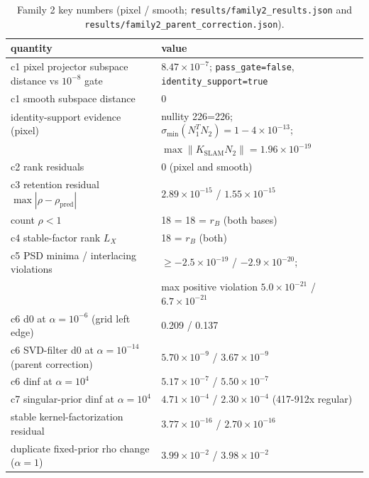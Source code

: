 \documentclass[12pt]{article}
\begin{document}
\begin{table}[ht]
\centering
\small
\caption{Family 2 key numbers (pixel / smooth; \texttt{results/family2\_results.json}
and \texttt{results/family2\_parent\_correction.json}).}
\label{tab:f2}
\begin{tabular}{p{} p{}}
\toprule
quantity & value \\
\midrule
c1 pixel projector subspace distance vs $10^{-8}$ gate &
$8.47\times10^{-7}$; \texttt{pass\_gate=false}, \texttt{identity\_support=true} \\
c1 smooth subspace distance & 0 \\
identity-support evidence (pixel) &
nullity 226=226; $\sigma_{\min}(N_1^TN_2)=1-4\times10^{-13}$; \\
 & $\max\|K_{\mathrm{SLAM}}N_2\|=1.96\times10^{-19}$ \\
c2 rank residuals & 0 (pixel and smooth) \\
c3 retention residual $\max|\rho-\rho_{\mathrm{pred}}|$ &
$2.89\times10^{-15}$ / $1.55\times10^{-15}$ \\
count $\rho<1$ & 18 = 18 = $r_B$ (both bases) \\
c4 stable-factor rank $L_X$ & 18 = $r_B$ (both) \\
c5 PSD minima / interlacing violations &
$\ge -2.5\times10^{-19}$ / $-2.9\times10^{-20}$; \\
 & max positive violation $5.0\times10^{-21}$ / $6.7\times10^{-21}$ \\
c6 d0 at $\alpha=10^{-6}$ (grid left edge) & 0.209 / 0.137 \\
c6 SVD-filter d0 at $\alpha=10^{-14}$ (parent correction) &
$5.70\times10^{-9}$ / $3.67\times10^{-9}$ \\
c6 dinf at $\alpha=10^{4}$ & $5.17\times10^{-7}$ / $5.50\times10^{-7}$ \\
c7 singular-prior dinf at $\alpha=10^{4}$ &
$4.71\times10^{-4}$ / $2.30\times10^{-4}$ (417-912x regular) \\
stable kernel-factorization residual &
$3.77\times10^{-16}$ / $2.70\times10^{-16}$ \\
duplicate fixed-prior rho change ($\alpha=1$) &
$3.99\times10^{-2}$ / $3.98\times10^{-2}$ \\
\bottomrule
\end{tabular}
\end{table}
\end{document}
